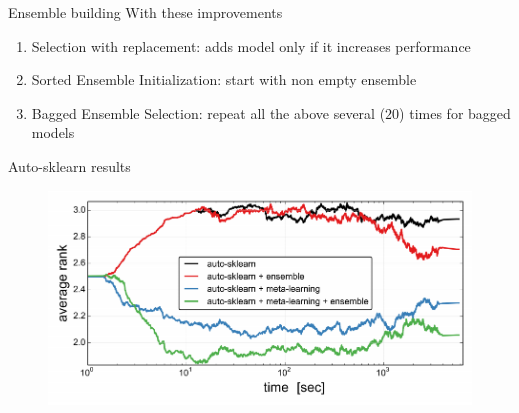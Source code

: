 \documentclass[12pt]{beamer}
\begin{document}
\begin{frame}{Ensemble building}
With these improvements
\pause
\begin{enumerate}
    \item Selection with replacement: adds model only if it increases performance \pause
    \item Sorted Ensemble Initialization: start with non empty ensemble \pause
    \item Bagged Ensemble Selection: repeat all the above several ($20$) times for bagged models \pause
\end{enumerate}


\end{frame}

\begin{frame}{Auto-sklearn results}
    \begin{figure}
\includegraphics[scale=0.5]{Auto_sklearn_result.png} 
\end{figure}
\end{frame}
\end{document}
